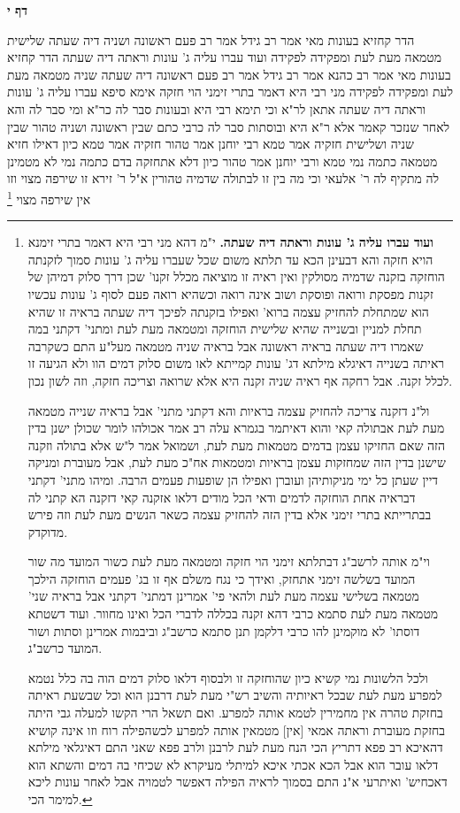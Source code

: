 \documentclass[12pt, openany]{book}
\newcommand{\sethebfont}{
\fontsize{10.5pt}{21.0pt} \selectfont
}
\newcommand{\twocol}[1]{
	{\sethebfont \begin{multicols}{2}
			#1
	\end{multicols}}	
}
\newcommand{\sectname}{}
\newcommand{\newsection}[1]{
	\addcontentsline{toc}{section}{#1}
	\renewcommand{\sectname}{#1}	
	\vspace{-\baselineskip}
	\begin{center}
		\textbf{%
\fontsize{16pt}{16pt}\selectfont
			#1}
	\end{center}
	\vspace{-\baselineskip}
	\nopagebreak
}
\newcommand{\footnotecomment}[1]{\footnote{#1}}
\newcommand{\commenta}[1]{\footnotecomment{#1}}
\begin{document}
\newsection{דף י}
\twocol{הדר קחזיא בעונות מאי  אמר רב גידל אמר רב  פעם ראשונה ושניה דיה שעתה שלישית מטמאה מעת לעת ומפקידה לפקידה 
ועוד עברו עליה ג' עונות וראתה דיה שעתה הדר קחזיא בעונות מאי 
אמר רב כהנא אמר רב גידל אמר רב  פעם ראשונה דיה שעתה שניה מטמאה מעת לעת ומפקידה לפקידה 
מני  רבי היא דאמר  בתרי זימני הוי חזקה 
אימא סיפא  עברו עליה ג' עונות וראתה דיה שעתה אתאן לר"א 
וכי תימא  רבי היא ובעונות סבר לה כר"א ומי סבר לה  והא לאחר שנזכר קאמר  אלא  ר"א היא ובוסתות סבר לה כרבי 
כתם שבין ראשונה ושניה טהור  שבין שניה ושלישית חזקיה אמר  טמא רבי יוחנן אמר  טהור  חזקיה אמר  טמא כיון דאילו חזיא מטמאה כתמה נמי טמא  ורבי יוחנן אמר  טהור כיון דלא אתחזקה בדם כתמה נמי לא מטמינן לה
מתקיף לה ר' אלעאי  וכי מה בין זו לבתולה שדמיה טהורין  א"ל ר' זירא  זו שירפה מצוי וזו אין שירפה מצוי 
\commenta{\textbf{ועוד עברו עליה ג' עונות וראתה דיה שעתה.}  י"מ דהא מני רבי היא דאמר בתרי זימנא הויא חזקה והא דבעינן הכא עד תלתא משום שכל שעברו עליה ג' עונות סמוך לזקנתה הוחזקה בזקנה שדמיה מסולקין ואין ראיה זו מוציאה מכלל זקנו' שכן דרך סלוק דמיהן של זקנות מפסקת ורואה ופוסקת ושוב אינה רואה וכשהיא רואה פעם לסוף ג' עונות עכשיו הוא שמתחלת להחזיק עצמה ברוא' ואפילו בזקנתה לפיכך דיה שעתה בראיה זו שהיא תחלת למניין ובשנייה שהיא שלישית הוחזקה ומטמאה מעת לעת ומתני' דקתני במה שאמרו דיה שעתה בראיה ראשונה אבל בראיה שניה מטמאה מעל"ע התם כשקרבה ראיתה בשנייה דאיגלא מילתא דג' עונות קמייתא לאו משום סלוק דמים הוו ולא הגיעה זו לכלל זקנה. אבל רחקה אף ראיה שניה זקנה היא אלא שרואה וצריכה חזקה, וזה לשון נכון.\par  ול"נ דזקנה צריכה להחזיק עצמה בראיות והא דקתני מתני' אבל בראיה שנייה מטמאה מעת לעת אבתולה קאי והוא דאיתמר בגמרא עלה רב אמר אכולהו לומר שכולן ישנן בדין הזה שאם החזיקו עצמן בדמים מטמאות מעת לעת, ושמואל אמר ל"ש אלא בתולה וזקנה שישנן בדין הזה שמחזקות עצמן בראיות ומטמאות אח"כ מעת לעת, אבל מעוברת ומניקה דיין שעתן כל ימי מניקותיהן ועוברן ואפילו הן שופעות פעמים הרבה. ומיהו מתני' דקתני דבראיה אחת הוחזקה לדמים ודאי הכל מודים דלאו אזקנה קאי דזקנה הא קתני לה בבתרייתא בתרי זימני אלא בדין הזה להחזיק עצמה כשאר הנשים מעת לעת וזה פירש מדוקדק.\par  וי"מ אותה לרשב"ג דבתלתא זימני הוי חזקה ומטמאה מעת לעת כשור המועד מה שור המועד בשלשה זימני אתחזק, ואידך כי נגח משלם אף זו בג' פעמים הוחזקה הילכך מטמאה בשלישי עצמה מעת לעת ולהאי פי' אמרינן דמתני' דקתני אבל בראיה שני' מטמאה מעת לעת סתמא כרבי דהא זקנה בכללה לדברי הכל ואינו מחוור. ועוד דשטתא דוסתו' לא מוקמינן להו כרבי דלקמן תנן סתמא כרשב"ג וביבמות אמרינן וסתות ושור המועד כרשב"ג.\par  ולכל הלשונות נמי קשיא כיון שהוחזקה זו ולבסוף דלאו סלוק דמים הוה בה כלל נטמא למפרע מעת לעת שבכל ראיותיה והשיב רש"י מעת לעת דרבנן הוא וכל שבשעת ראיתה בחזקת טהרה אין מחמירין לטמא אותה למפרע. ואם תשאל הרי הקשו למעלה גבי היתה בחזקת מעוברת וראתה אמאי [אין] מטמאין אותה למפרע לכשהפילה רוח וזו אינה קושיא דהאיכא רב פפא דתריץ הכי הנח מעת לעת לרבנן ולרב פפא שאני התם דאיגלאי מילתא דלאו עובר הוא אבל הכא אכתי איכא למיתלי מעיקרא לא שכיחי בה דמים והשתא הוא דאכחיש' ואיתרעי א"נ התם בסמוך לראיה הפילה דאפשר לטמויה אבל לאחר עונות ליכא למימר הכי. }

}
\end{document}
